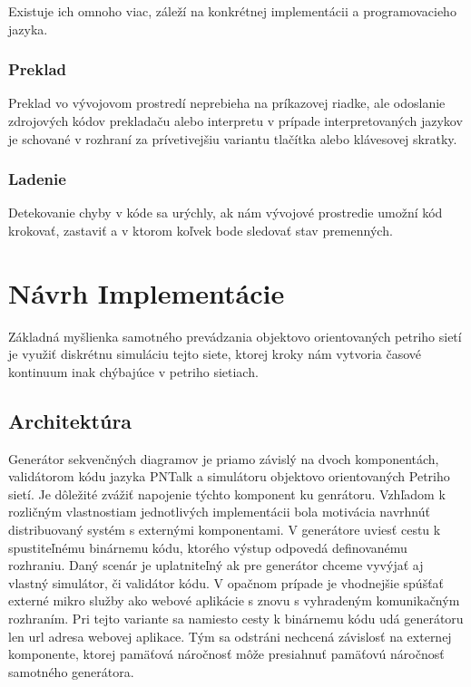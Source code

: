 	Existuje ich omnoho viac, záleží na konkrétnej implementácii a programovacieho jazyka.
	
	\subsection{Preklad}
	Preklad vo vývojovom prostredí neprebieha na príkazovej riadke, ale odoslanie zdrojových kódov prekladaču alebo interpretu v prípade interpretovaných jazykov je schované v rozhraní za prívetivejšiu variantu tlačítka alebo klávesovej skratky.
	
	\subsection{Ladenie}
	Detekovanie chyby v kóde sa urýchly, ak nám vývojové prostredie umožní kód krokovať, zastaviť a v ktorom koľvek bode sledovať stav premenných.



\chapter{Návrh Implementácie}

Základná myšlienka samotného prevádzania objektovo orientovaných petriho sietí je využiť diskrétnu simuláciu tejto siete, ktorej kroky nám vytvoria časové kontinuum inak chýbajúce v petriho sietiach. 

\section{Architektúra}

Generátor sekvenčných diagramov\cite{Analysis2012} je priamo závislý na dvoch komponentách, validátorom kódu jazyka PNTalk a simulátoru objektovo orientovaných Petriho sietí. Je dôležité zvážiť napojenie týchto komponent ku genrátoru. Vzhľadom k rozličným vlastnostiam jednotlivých implementácii bola motivácia navrhnúť distribuovaný systém s externými komponentami. V generátore uviesť cestu k spustiteľnému binárnemu kódu, ktorého výstup odpovedá definovanému rozhraniu. Daný scenár je uplatniteľný ak pre generátor chceme vyvýjať aj vlastný simulátor, či validátor kódu. V opačnom prípade je vhodnejšie spúšťať externé mikro služby ako webové aplikácie s znovu s vyhradeným komunikačným rozhraním. Pri tejto variante sa namiesto cesty k binárnemu kódu udá generátoru len url adresa webovej aplikace. Tým sa odstráni nechcená závislosť na externej komponente, ktorej pamäťová náročnosť môže presiahnuť pamäťovú náročnosť samotného generátora.

